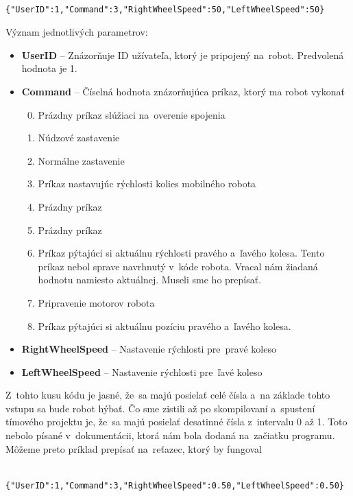 	\label{jsonSpeedRequestBad}
	\begin{lstlisting}
			{"UserID":1,"Command":3,"RightWheelSpeed":50,"LeftWheelSpeed":50}
	\end{lstlisting}

	\newpage

	\noindent Význam jednotlivých parametrov:
	\begin{itemize}
		\item \textbf{UserID} -- Znázorňuje ID užívateľa, ktorý je pripojený na~robot. Predvolená hodnota je 1.
		\item \textbf{Command} --  Číselná hodnota znázorňujúca príkaz, ktorý ma robot vykonať
			\begin{enumerate}
				\setcounter{enumi}{-1}
				\item \label{c0} Prázdny príkaz slúžiaci na~overenie spojenia
				\item \label{c1} Núdzové zastavenie
				\item \label{c2} Normálne zastavenie
				\item \label{c3} Príkaz nastavujúc rýchlosti kolies mobilného robota
				\item \label{c4} Prázdny príkaz
				\item \label{c5} Prázdny príkaz
				\item \label{c6} Príkaz pýtajúci si aktuálnu rýchlosti pravého a~ľavého kolesa. Tento príkaz nebol sprave navrhnutý v~kóde
					robota. Vracal nám žiadaná hodnotu namiesto aktuálnej. Museli sme ho prepísať.
				\item \label{c7} Pripravenie motorov robota
				\item \label{c8} Príkaz pýtajúci si aktuálnu pozíciu pravého a~ľavého kolesa.
			\end{enumerate}
		\item \textbf{RightWheelSpeed} -- Nastavenie rýchlosti pre~pravé koleso
		\item \textbf{LeftWheelSpeed} -- Nastavenie rýchlosti pre~ľavé koleso
	\end{itemize}

	\noindent Z~tohto kusu kódu je jasné, že~sa majú posielať celé čísla a~na základe tohto vstupu sa bude robot hýbať. Čo sme zistili až
	po skompilovaní a~spustení tímového projektu je, že~sa majú posielať desatinné čísla z~intervalu 0 až 1. Toto nebolo písané
	v~dokumentácii, ktorá nám bola dodaná na~začiatku programu. Môžeme preto príklad prepísať na~reťazec, ktorý by fungoval

	\label{jsonSpeedRequestGood}
	\begin{lstlisting}
			{"UserID":1,"Command":3,"RightWheelSpeed":0.50,"LeftWheelSpeed":0.50}
	\end{lstlisting}

